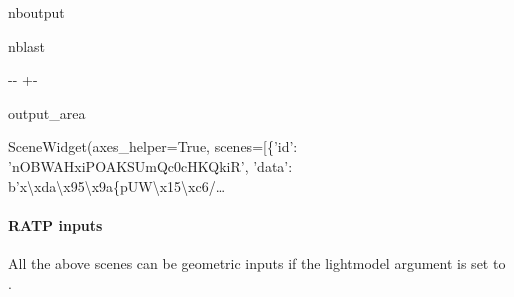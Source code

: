 \documentclass[letterpaper,10pt,english]{sphinxmanual}
\begin{document}
\begin{sphinxuseclass}{nboutput}
\begin{sphinxuseclass}{nblast}
{

\kern-\sphinxverbatimsmallskipamount\kern-\baselineskip
\kern+\FrameHeightAdjust\kern-\fboxrule
\vspace{\nbsphinxcodecellspacing}

\begin{sphinxuseclass}{output_area}
\begin{sphinxuseclass}{}


\begin{sphinxVerbatim}[commandchars=\\\{\}]
\llap{\color{nbsphinxout}[18]:\,\hspace{\fboxrule}\hspace{\fboxsep}}SceneWidget(axes\_helper=True, scenes=[\{'id': 'nOBWAHxiPOAKSUmQc0cHKQkiR', 'data': b'x\textbackslash{}xda\textbackslash{}x95\textbackslash{}x9a\{pUW\textbackslash{}x15\textbackslash{}xc6/…
\end{sphinxVerbatim}



\end{sphinxuseclass}
\end{sphinxuseclass}
}

\end{sphinxuseclass}
\end{sphinxuseclass}

\paragraph{RATP inputs}
\label{\detokenize{input_scenes:RATP-inputs}}
\sphinxAtStartPar
All the above scenes can be geometric inputs if the lightmodel argument is set to .
\end{document}
